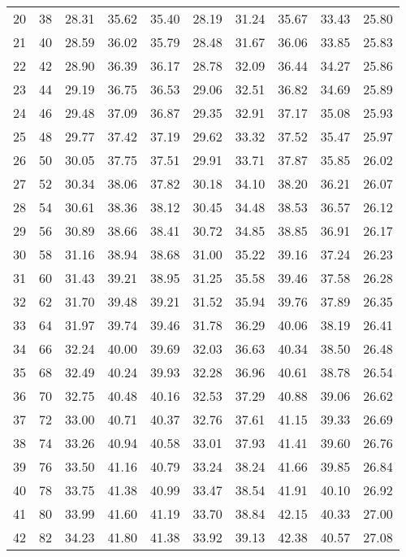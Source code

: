 \begin{longtable}{rrllllllll}
		20 & 38 & 28.31 & 35.62 & 35.40 & 28.19 & 31.24 & 35.67 & 33.43 & 25.80 \\ 
		21 & 40 & 28.59 & 36.02 & 35.79 & 28.48 & 31.67 & 36.06 & 33.85 & 25.83 \\ 
		22 & 42 & 28.90 & 36.39 & 36.17 & 28.78 & 32.09 & 36.44 & 34.27 & 25.86 \\ 
		23 & 44 & 29.19 & 36.75 & 36.53 & 29.06 & 32.51 & 36.82 & 34.69 & 25.89 \\ 
		24 & 46 & 29.48 & 37.09 & 36.87 & 29.35 & 32.91 & 37.17 & 35.08 & 25.93 \\ 
		25 & 48 & 29.77 & 37.42 & 37.19 & 29.62 & 33.32 & 37.52 & 35.47 & 25.97 \\ 
		26 & 50 & 30.05 & 37.75 & 37.51 & 29.91 & 33.71 & 37.87 & 35.85 & 26.02 \\ 
		27 & 52 & 30.34 & 38.06 & 37.82 & 30.18 & 34.10 & 38.20 & 36.21 & 26.07 \\ 
		28 & 54 & 30.61 & 38.36 & 38.12 & 30.45 & 34.48 & 38.53 & 36.57 & 26.12 \\ 
		29 & 56 & 30.89 & 38.66 & 38.41 & 30.72 & 34.85 & 38.85 & 36.91 & 26.17 \\ 
		30 & 58 & 31.16 & 38.94 & 38.68 & 31.00 & 35.22 & 39.16 & 37.24 & 26.23 \\ 
		31 & 60 & 31.43 & 39.21 & 38.95 & 31.25 & 35.58 & 39.46 & 37.58 & 26.28 \\ 
		32 & 62 & 31.70 & 39.48 & 39.21 & 31.52 & 35.94 & 39.76 & 37.89 & 26.35 \\ 
		33 & 64 & 31.97 & 39.74 & 39.46 & 31.78 & 36.29 & 40.06 & 38.19 & 26.41 \\ 
		34 & 66 & 32.24 & 40.00 & 39.69 & 32.03 & 36.63 & 40.34 & 38.50 & 26.48 \\ 
		35 & 68 & 32.49 & 40.24 & 39.93 & 32.28 & 36.96 & 40.61 & 38.78 & 26.54 \\ 
		36 & 70 & 32.75 & 40.48 & 40.16 & 32.53 & 37.29 & 40.88 & 39.06 & 26.62 \\ 
		37 & 72 & 33.00 & 40.71 & 40.37 & 32.76 & 37.61 & 41.15 & 39.33 & 26.69 \\ 
		38 & 74 & 33.26 & 40.94 & 40.58 & 33.01 & 37.93 & 41.41 & 39.60 & 26.76 \\ 
		39 & 76 & 33.50 & 41.16 & 40.79 & 33.24 & 38.24 & 41.66 & 39.85 & 26.84 \\ 
		40 & 78 & 33.75 & 41.38 & 40.99 & 33.47 & 38.54 & 41.91 & 40.10 & 26.92 \\ 
		41 & 80 & 33.99 & 41.60 & 41.19 & 33.70 & 38.84 & 42.15 & 40.33 & 27.00 \\ 
		42 & 82 & 34.23 & 41.80 & 41.38 & 33.92 & 39.13 & 42.38 & 40.57 & 27.08 \\ 

\end{longtable}
